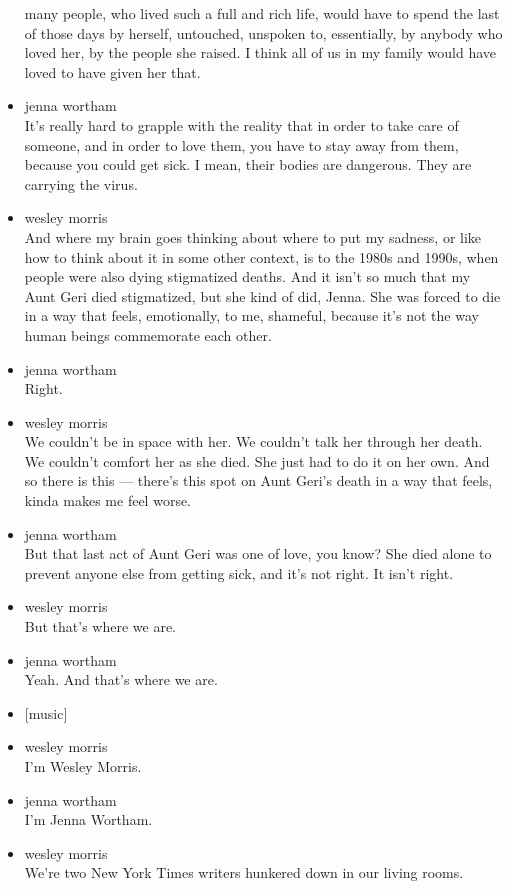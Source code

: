 \begin{itemize}
  many people, who lived such a full and rich life, would have to spend
  the last of those days by herself, untouched, unspoken to,
  essentially, by anybody who loved her, by the people she raised. I
  think all of us in my family would have loved to have given her that.
\item
  jenna wortham\\
  It's really hard to grapple with the reality that in order to take
  care of someone, and in order to love them, you have to stay away from
  them, because you could get sick. I mean, their bodies are dangerous.
  They are carrying the virus.
\item
  wesley morris\\
  And where my brain goes thinking about where to put my sadness, or
  like how to think about it in some other context, is to the 1980s and
  1990s, when people were also dying stigmatized deaths. And it isn't so
  much that my Aunt Geri died stigmatized, but she kind of did, Jenna.
  She was forced to die in a way that feels, emotionally, to me,
  shameful, because it's not the way human beings commemorate each
  other.
\item
  jenna wortham\\
  Right.
\item
  wesley morris\\
  We couldn't be in space with her. We couldn't talk her through her
  death. We couldn't comfort her as she died. She just had to do it on
  her own. And so there is this --- there's this spot on Aunt Geri's
  death in a way that feels, kinda makes me feel worse.
\item
  jenna wortham\\
  But that last act of Aunt Geri was one of love, you know? She died
  alone to prevent anyone else from getting sick, and it's not right. It
  isn't right.
\item
  wesley morris\\
  But that's where we are.
\item
  jenna wortham\\
  Yeah. And that's where we are.
\item
  {[}music{]}
\item
  wesley morris\\
  I'm Wesley Morris.
\item
  jenna wortham\\
  I'm Jenna Wortham.
\item
  wesley morris\\
  We're two New York Times writers hunkered down in our living rooms.

\end{itemize}
